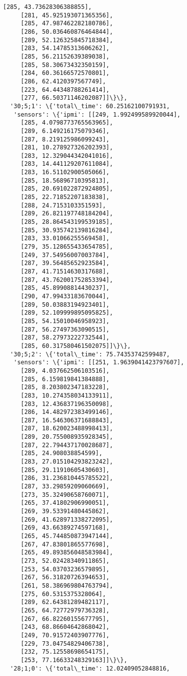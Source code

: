 \documentclass[11pt]{article}
\begin{document}
\begin{tcolorbox}[breakable, size=fbox, boxrule=.5pt, pad at break*=1mm, opacityfill=0]
\begin{Verbatim}[commandchars=\\\{\}]
     [285, 43.73628306388855],
     [281, 45.925193071365356],
     [285, 47.987462282180786],
     [286, 50.036460876464844],
     [289, 52.126325845718384],
     [283, 54.14785313606262],
     [285, 56.21152639389038],
     [285, 58.30673432350159],
     [284, 60.36166572570801],
     [286, 62.4120397567749],
     [223, 64.44348788261414],
     [277, 66.50371146202087]]\}\},
  '30;5;1': \{'total\_time': 60.25162100791931,
   'sensors': \{'ipmi': [[249, 1.992499589920044],
     [285, 4.0798773765563965],
     [289, 6.149216175079346],
     [287, 8.219125986099243],
     [281, 10.278927326202393],
     [283, 12.329044342041016],
     [283, 14.441129207611084],
     [283, 16.51102900505066],
     [285, 18.56896710395813],
     [285, 20.691022872924805],
     [285, 22.71852207183838],
     [288, 24.7153103351593],
     [289, 26.821197748184204],
     [285, 28.864543199539185],
     [285, 30.935742139816284],
     [283, 33.01066255569458],
     [279, 35.128655433654785],
     [249, 37.54956007003784],
     [287, 39.56485652923584],
     [287, 41.71514630317688],
     [287, 43.762001752853394],
     [285, 45.89908814430237],
     [290, 47.99433183670044],
     [289, 50.03883194923401],
     [289, 52.109999895095825],
     [285, 54.15010046958923],
     [287, 56.27497363090515],
     [287, 58.27973222732544],
     [285, 60.317580461502075]]\}\},
  '30;5;2': \{'total\_time': 75.74353742599487,
   'sensors': \{'ipmi': [[251, 1.9639041423797607],
     [289, 4.037662506103516],
     [285, 6.159819841384888],
     [285, 8.203802347183228],
     [283, 10.274358034133911],
     [283, 12.436837196350098],
     [286, 14.482972383499146],
     [287, 16.546306371688843],
     [287, 18.620023488998413],
     [289, 20.755008935928345],
     [287, 22.794437170028687],
     [285, 24.908038854599],
     [283, 27.015104293823242],
     [285, 29.11910605430603],
     [286, 31.236810445785522],
     [287, 33.29859209060669],
     [273, 35.32490658760071],
     [265, 37.41802906990051],
     [269, 39.53391480445862],
     [269, 41.628971338272095],
     [269, 43.66389274597168],
     [265, 45.744850873947144],
     [267, 47.83801865577698],
     [265, 49.893856048583984],
     [273, 52.02428340911865],
     [253, 54.03703236579895],
     [267, 56.31820726394653],
     [261, 58.386969804763794],
     [275, 60.5315375328064],
     [289, 62.64381289482117],
     [265, 64.72772979736328],
     [267, 66.82260155677795],
     [243, 68.86604642868042],
     [249, 70.91572403907776],
     [229, 73.04754829406738],
     [232, 75.12558698654175],
     [253, 77.16633248329163]]\}\},
  '28;1;0': \{'total\_time': 12.02409052848816,

\end{Verbatim}
\end{tcolorbox}
\end{document}
